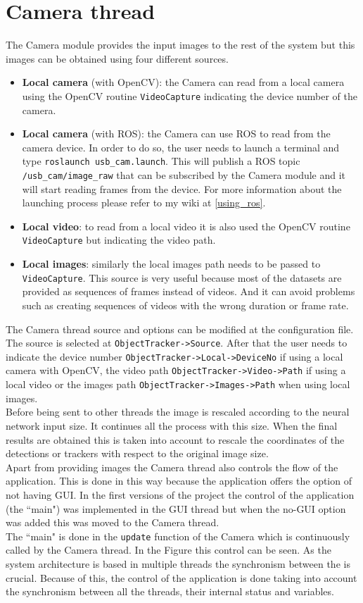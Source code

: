 \section{Camera thread}
The Camera module provides the input images to the rest of the system but this images can be obtained using four different sources.
\begin{itemize}
    \item \textbf{Local camera} (with OpenCV): the Camera can read from a local camera using the OpenCV routine \texttt{VideoCapture} indicating the device number of the camera.
    \item \textbf{Local camera} (with ROS): the Camera can use ROS to read from the camera device. In order to do so, the user needs to launch a terminal and type \texttt{roslaunch usb\_cam.launch}. This will publish a ROS topic \texttt{/usb\_cam/image\_raw} that can be subscribed by the Camera module and it will start reading frames from the device. For more information about the launching process please refer to my wiki at \ref{using_ros}.
    \item \textbf{Local video}: to read from a local video it is also used the OpenCV routine \texttt{VideoCapture} but indicating the video path.
\item \textbf{Local images}: similarly the local images path needs to be passed to \texttt{VideoCapture}. This source is very useful because most of the datasets are provided as sequences of frames instead of videos. And it can avoid problems such as creating sequences of videos with the wrong duration or frame rate.
\end{itemize}
The Camera thread source and options can be modified at the configuration file. The source is selected at \texttt{ObjectTracker->Source}. After that the user needs to indicate the device number \texttt{ObjectTracker->Local->DeviceNo} if using a local camera with OpenCV, the video path \texttt{ObjectTracker->Video->Path} if using a local video or the images path \texttt{ObjectTracker->Images->Path} when using local images.\\
Before being sent to other threads the image is rescaled according to the neural network input size. It continues all the process with this size. When the final results are obtained this is taken into account to rescale the coordinates of the detections or trackers with respect to the original image size.\\
Apart from providing images the Camera thread also controls the flow of the application. This is done in this way because the application offers the option of not having GUI. In the first versions of the project the control of the application (the ``main") was implemented in the GUI thread but when the no-GUI option was added this was moved to the Camera thread.\\
The ``main" is done in the \texttt{update} function of the Camera which is continuously called by the Camera thread. In the Figure %
this control can be seen. As the system architecture is based in multiple threads the synchronism between the is crucial. Because of this, the control of the application is done taking into account the synchronism between all the threads, their internal status and variables.

